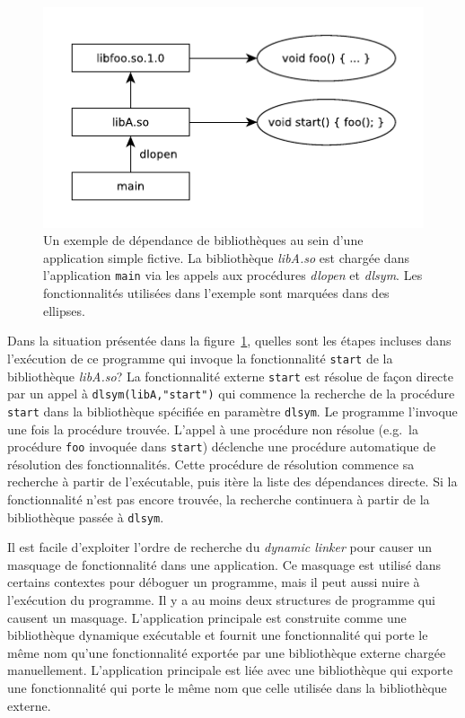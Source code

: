 \begin{center}
    \begin{figure}[ht]
        \includegraphics{figures/libdeps-ex1.pdf}

        \caption{Un exemple de dépendance de bibliothèques au sein d'une
          application simple fictive.  La bibliothèque \textit{libA.so} est
          chargée dans l'application \texttt{main} via les appels aux procédures
          \textit{dlopen} et \textit{dlsym}. Les fonctionnalités utilisées dans
          l'exemple sont marquées dans des ellipses.}

        \label{fig:deps-ex1}
    \end{figure}
\end{center}

Dans la situation présentée dans la figure~\ref{fig:deps-ex1}, quelles sont les
étapes incluses dans l'exécution de ce programme qui invoque la fonctionnalité
\texttt{start} de la bibliothèque \textit{libA.so}? La fonctionnalité externe
\texttt{start} est résolue de façon directe par un appel à
\verb|dlsym(libA,"start")| qui commence la recherche de la procédure
\texttt{start} dans la bibliothèque spécifiée en paramètre \texttt{dlsym}. Le
programme l'invoque une fois la procédure trouvée.  L'appel à une procédure non
résolue (e.g.\ la procédure \texttt{foo} invoquée dans \texttt{start})
déclenche une procédure automatique de résolution des fonctionnalités. Cette
procédure de résolution commence sa recherche à partir de l'exécutable, puis
itère la liste des dépendances directe. Si la fonctionnalité n'est pas encore
trouvée, la recherche continuera à partir de la bibliothèque passée à
\texttt{dlsym}.


Il est facile d'exploiter l'ordre de recherche du \textit{dynamic linker} pour
causer un masquage de fonctionnalité dans une application. Ce masquage est
utilisé dans certains contextes pour déboguer un programme, mais il peut aussi
nuire à l'exécution du programme. Il y a au moins deux structures de programme
qui causent un masquage. L'application principale est construite comme une
bibliothèque dynamique exécutable et fournit une fonctionnalité qui porte le
même nom qu'une fonctionnalité exportée par une bibliothèque externe chargée
manuellement.  L'application principale est liée avec une bibliothèque qui
exporte une fonctionnalité qui porte le même nom que celle utilisée dans la
bibliothèque externe.

